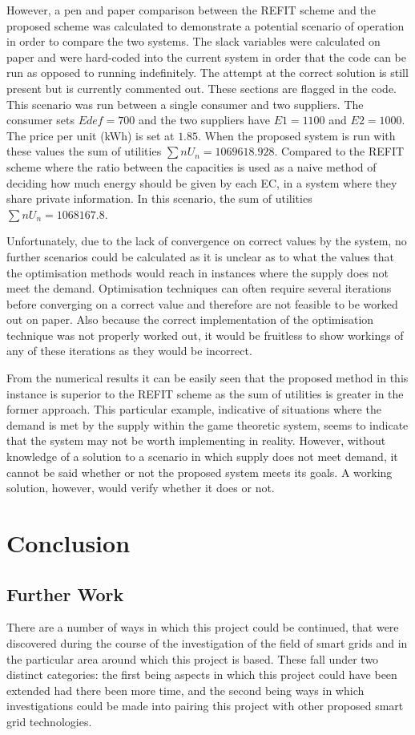 \documentclass[a4paper, notitlepage]{report}
\begin{document}
However, a pen and paper comparison between the REFIT scheme and the proposed
scheme was calculated to demonstrate a potential scenario of operation in order
to compare the two systems. The slack variables were calculated on paper and
were hard-coded into the current system in order that the code can be run as
opposed to running indefinitely. The attempt at the correct solution is still
present but is currently commented out. These sections are flagged in the code.
This scenario was run between a single consumer and two suppliers. The consumer
sets \(Edef= 700\) and the two suppliers have \(E1 = 1100\) and \(E2 = 1000\). The
price per unit (kWh) is set at \(1.85\). When the proposed system is run with
these values the sum of utilities \(∑n U_n = 1069618.928\). Compared to the REFIT
scheme where the ratio between the capacities is used as a naive method of
deciding how much energy should be given by each EC, in a system where they
share private information. In this scenario, the sum of utilities \(∑n U_n =
1068167.8\).

Unfortunately, due to the lack of convergence on correct values by the system, no
further scenarios could be calculated as it is unclear as to what the values
that the optimisation methods would reach in instances where the supply does not
meet the demand. Optimisation techniques can often require several iterations
before converging on a correct value and therefore are not feasible to be worked
out on paper. Also because the correct implementation of the optimisation
technique was not properly worked out, it would be fruitless to show workings of
any of these iterations as they would be incorrect.

From the numerical results it can be easily seen that the proposed method in
this instance is superior to the REFIT scheme as the sum of utilities is greater
in the former approach. This particular example, indicative of situations where
the demand is met by the supply within the game theoretic system, seems to
indicate that the system may not be worth implementing in reality. However,
without knowledge of a solution to a scenario in which supply does not meet
demand, it cannot be said whether or not the proposed system meets its goals. A working
solution, however, would verify whether it does or not.
\part{Conclusion}
\label{sec:org5236992}
\chapter{Further Work}
\label{sec:org6ffcf1f}
There are a number of ways in which this project could be continued, that were
discovered during the course of the investigation of the field of smart grids
and in the particular area around which this project is based. These fall under
two distinct categories: the first being aspects in which this project could
have been extended had there been more time, and the second being ways in which
investigations could be made into pairing this project with other proposed smart
grid technologies.
\end{document}
